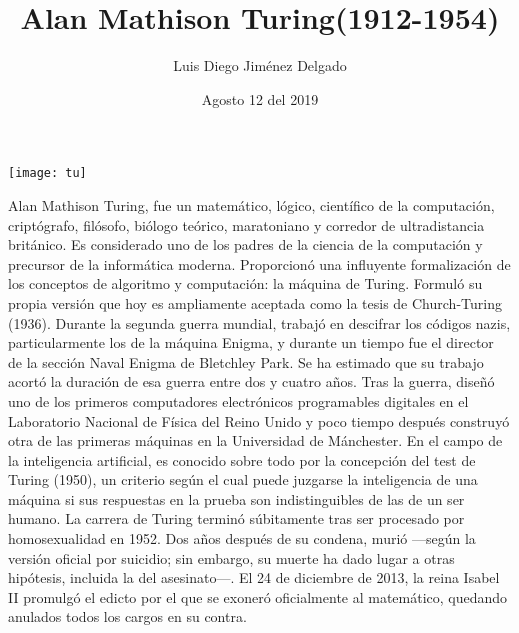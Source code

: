 \documentclass[12pt]{article}
\title{Alan Mathison Turing(1912-1954)}
\author{Luis Diego Jiménez Delgado}
\date{Agosto 12 del 2019}
\begin{document}
\maketitle

\begin{center}
\texttt{[image: tu]}
\end{center}

Alan Mathison Turing, fue un matemático, lógico, científico de la computación, criptógrafo, filósofo, biólogo teórico, maratoniano y corredor de ultradistancia británico.
Es considerado uno de los padres de la ciencia de la computación y precursor de la informática moderna. Proporcionó una influyente formalización de los conceptos de algoritmo y computación: la máquina de Turing. Formuló su propia versión que hoy es ampliamente aceptada como la tesis de Church-Turing (1936).
Durante la segunda guerra mundial, trabajó en descifrar los códigos nazis, particularmente los de la máquina Enigma, y durante un tiempo fue el director de la sección Naval Enigma de Bletchley Park. Se ha estimado que su trabajo acortó la duración de esa guerra entre dos y cuatro años. Tras la guerra, diseñó uno de los primeros computadores electrónicos programables digitales en el Laboratorio Nacional de Física del Reino Unido y poco tiempo después construyó otra de las primeras máquinas en la Universidad de Mánchester.
En el campo de la inteligencia artificial, es conocido sobre todo por la concepción del test de Turing (1950), un criterio según el cual puede juzgarse la inteligencia de una máquina si sus respuestas en la prueba son indistinguibles de las de un ser humano.
La carrera de Turing terminó súbitamente tras ser procesado por homosexualidad en 1952. Dos años después de su condena, murió —según la versión oficial por suicidio; sin embargo, su muerte ha dado lugar a otras hipótesis, incluida la del asesinato—. El 24 de diciembre de 2013, la reina Isabel II promulgó el edicto por el que se exoneró oficialmente al matemático, quedando anulados todos los cargos en su contra.
\end{document}
